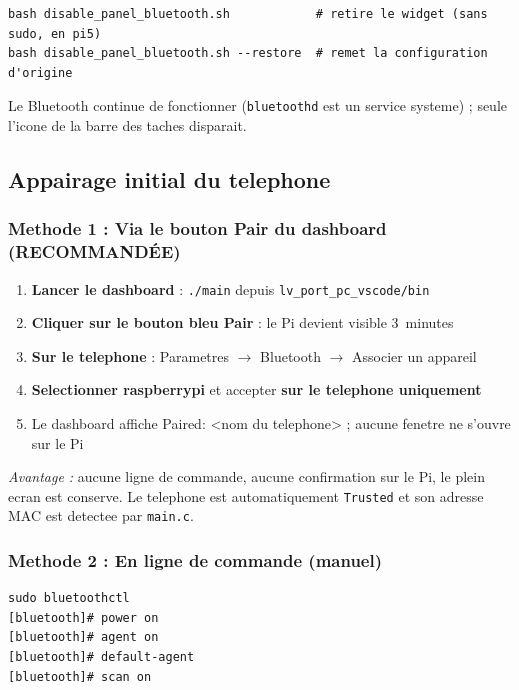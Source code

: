 \documentclass[a4paper,11pt]{article}
\begin{document}
\begin{lstlisting}[style=bashcode]
bash disable_panel_bluetooth.sh            # retire le widget (sans sudo, en pi5)
bash disable_panel_bluetooth.sh --restore  # remet la configuration d'origine
\end{lstlisting}

Le Bluetooth continue de fonctionner (\texttt{bluetoothd} est un service systeme) ;
seule l'icone de la barre des taches disparait.

\subsection{Appairage initial du telephone}

\subsubsection{Methode 1 : Via le bouton Pair du dashboard (RECOMMANDÉE)}

\begin{enumerate}
  \item \textbf{Lancer le dashboard} : \texttt{./main} depuis \texttt{lv\_port\_pc\_vscode/bin}
  \item \textbf{Cliquer sur le bouton bleu \og Pair\fg{}} : le Pi devient visible 3~minutes
  \item \textbf{Sur le telephone} : Parametres $\to$ Bluetooth $\to$ Associer un appareil
  \item \textbf{Selectionner \og raspberrypi\fg{}} et accepter \textbf{sur le telephone uniquement}
  \item Le dashboard affiche \og Paired: <nom du telephone>\fg{} ; aucune fenetre ne s'ouvre sur le Pi
\end{enumerate}

\emph{Avantage :} aucune ligne de commande, aucune confirmation sur le Pi, le plein ecran
est conserve. Le telephone est automatiquement \texttt{Trusted} et son adresse MAC est
detectee par \texttt{main.c}.

\subsubsection{Methode 2 : En ligne de commande (manuel)}

\begin{lstlisting}[style=bashcode]
sudo bluetoothctl
[bluetooth]# power on
[bluetooth]# agent on
[bluetooth]# default-agent
[bluetooth]# scan on
\end{lstlisting}
\end{document}
